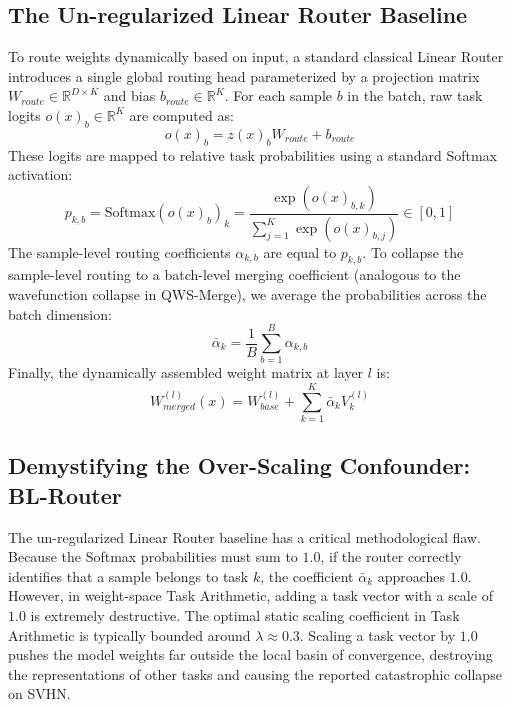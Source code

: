 \subsection{The Un-regularized Linear Router Baseline}
To route weights dynamically based on input, a standard classical Linear Router introduces a single global routing head parameterized by a projection matrix $W_{route} \in \mathbb{R}^{D \times K}$ and bias $b_{route} \in \mathbb{R}^K$. For each sample $b$ in the batch, raw task logits $o(x)_b \in \mathbb{R}^K$ are computed as:
\begin{equation}
    o(x)_b = z(x)_b W_{route} + b_{route}
\end{equation}
These logits are mapped to relative task probabilities using a standard Softmax activation:
\begin{equation}
    p_{k, b} = \text{Softmax}(o(x)_b)_k = \frac{\exp(o(x)_{b, k})}{\sum_{j=1}^K \exp(o(x)_{b, j})} \in [0, 1]
\end{equation}
The sample-level routing coefficients $\alpha_{k, b}$ are equal to $p_{k, b}$. To collapse the sample-level routing to a batch-level merging coefficient (analogous to the wavefunction collapse in QWS-Merge), we average the probabilities across the batch dimension:
\begin{equation}
    \bar{\alpha}_k = \frac{1}{B} \sum_{b=1}^B \alpha_{k, b}
\end{equation}
Finally, the dynamically assembled weight matrix at layer $l$ is:
\begin{equation}
    W_{merged}^{(l)}(x) = W_{base}^{(l)} + \sum_{k=1}^K \bar{\alpha}_k V_k^{(l)}
\end{equation}

\subsection{Demystifying the Over-Scaling Confounder: BL-Router}
The un-regularized Linear Router baseline has a critical methodological flaw. Because the Softmax probabilities must sum to $1.0$, if the router correctly identifies that a sample belongs to task $k$, the coefficient $\bar{\alpha}_k$ approaches $1.0$. 
However, in weight-space Task Arithmetic, adding a task vector with a scale of $1.0$ is extremely destructive. The optimal static scaling coefficient in Task Arithmetic is typically bounded around $\lambda \approx 0.3$. Scaling a task vector by $1.0$ pushes the model weights far outside the local basin of convergence, destroying the representations of other tasks and causing the reported catastrophic collapse on SVHN. 

